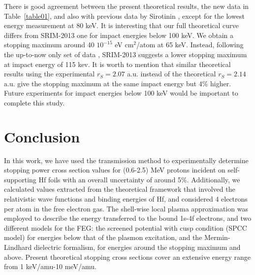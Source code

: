 \documentclass[aps,prb,reprint,groupedaddress]{revtex4-1}
\begin{document}
There is good agreement between the present theoretical results, the new data in Table~\ref{table01}, and also with previous data by Sirotinin \cite{Sirotinin}, except for the lowest energy measurement at 80 keV. It is interesting that our full theoretical curve differs from SRIM-2013 one for impact energies below 100 keV. We obtain a stopping maximum around 40 $10^{-15}$ eV cm$^2$/atom  at 65 keV. Instead, following the up-to-now only set of data \cite{Sirotinin}, SRIM-2013 suggests a lower stopping maximum %
at impact energy of 115 kev. It is worth to mention that similar theoretical results using the experimental $r_S=2.07$ a.u. instead of the theoretical $r_S=2.14$ a.u. give the stopping maximum at the same impact energy but $4\%$ higher. Future experiments for
impact energies below 100 keV would be important to complete this study.


\section{Conclusion}
\label{conclusion}
In this work, we have used the transmission method to experimentally determine stopping power cross section values for (0.6-2.5) MeV protons incident on self-supporting Hf foils with an overall uncertainty of around 5\%. Additionally, we calculated values extracted from the theoretical framework that involved the relativistic wave functions and binding energies of Hf, and considered 4 electrons per atom in the free electron gas. The shell-wise local plasma approximation was employed to describe the energy transferred to the bound 1s-4f electrons, and two different models for the FEG: the screened potential with cusp condition (SPCC model) for energies below that of the plasmon excitation, and the Mermin-Lindhard dielectric formalism, for energies around the stopping maximum and above. Present theoretical stopping cross sections cover an extensive energy range from 1 keV/amu-10 meV/amu.
\end{document}
